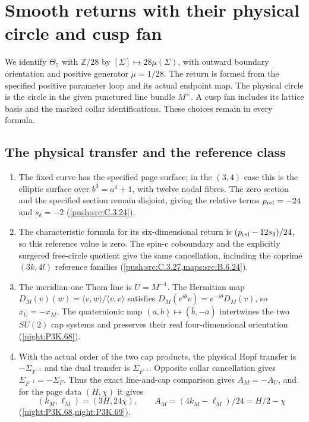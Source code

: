 \section{Smooth returns with their physical circle and cusp fan}
\label{sec:IV-results}

We identify $\Theta _7$ with $\mathbb Z/28$ by
$[\Sigma]\mapsto28\mu(\Sigma)$, with outward boundary orientation
and positive generator $\mu=1/28$.  The return is formed from the
specified positive parameter loop and its actual endpoint map.
The physical circle is the circle in the given punctured line bundle
$M^\times$.  A cusp fan includes its lattice basis and the marked
collar identifications.  These choices remain in every formula.

\subsection{The physical transfer and the reference class}
\RungOne
\begin{enumerate}[label=\arabic*.]
\item The fixed curve has the specified page surface; in the
  $(3,4)$ case this is the elliptic surface over
  $b^3=a^4+1$, with twelve nodal fibres.  The zero section and the
  specified section remain disjoint, giving the relative terms
  $p_{\rm rel}=-24$ and $s_\delta=-2$
  (\cref{push:src:C.3.24}).
\item The characteristic formula for its six-dimensional return
  is $(p_{\rm rel}-12s_\delta)/24$, so this reference value is zero.
  The spin-c coboundary and the explicitly surgered free-circle
  quotient give the same cancellation, including the coprime
  $(3k,4l)$ reference families
  (\cref{push:src:C.3.27,maps:src:B.6.24}).
\item The meridian-one Thom line is $U=M^{-1}$.  The Hermitian
  map $D_M(v)(w)=\langle v,w\rangle/\langle v,v\rangle$ satisfies
  $D_M(e^{i\theta}v)=e^{-i\theta}D_M(v)$, so $x_U=-x_M$.
  The quaternionic map $(a,b)\mapsto(\bar b,-\bar a)$ intertwines
  the two $SU(2)$ cap systems and preserves their real
  four-dimensional orientation (\cref{night:P3K.68}).
\item With the actual order of the two cap products, the physical
  Hopf transfer is $-\Sigma_{F^{-1}}$ and the dual transfer is
  $\Sigma_{F^{-1}}$.  Opposite collar cancellation gives
  $\Sigma_{F^{-1}}=-\Sigma_F$.  Thus the exact line-and-cap
  comparison gives $A_M=-A_U$, and for the page data $(H,\chi)$
  it gives
  \[
  (k_M,\ell_M)=(3H,24\chi),\qquad
  A_M=(4k_M-\ell_M)/24=H/2-\chi
  \]
  (\cref{night:P3K.68,night:P3K.69}).
\end{enumerate}

